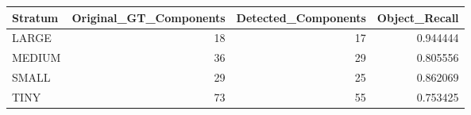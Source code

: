 \begin{tabular}{lrrr}
\toprule
Stratum & Original_GT_Components & Detected_Components & Object_Recall \\
\midrule
LARGE & 18 & 17 & 0.944444 \\
MEDIUM & 36 & 29 & 0.805556 \\
SMALL & 29 & 25 & 0.862069 \\
TINY & 73 & 55 & 0.753425 \\
\bottomrule
\end{tabular}

